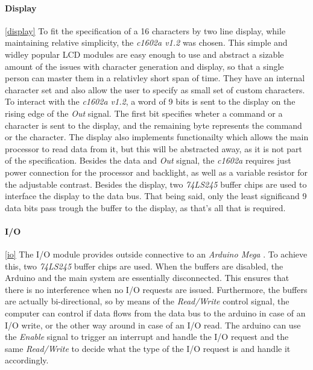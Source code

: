

\paragraph{Display} \ref{display}
To fit the specification of a 16 characters by two line display, while maintaining relative simplicity, the \emph{c1602a v1.2}
\cite{c1602a} was chosen. This simple and widley popular LCD modules are easy enough to use and abstract a sizable amount of the
issues with character generation and display, so that a single person can master them in a relativley short span of time. They have
an internal character set and also allow the user to specify as small set of custom characters. To interact with the
\emph{c1602a v1.2}, a word of 9 bits is sent to the display on the rising edge of the \emph{Out} signal. The first bit
specifies wheter a command or a character is sent to the display, and the remaining byte represents the command or the character.
The display also implements functionailty which allows the main processor to read data from it, but this will be abstracted away,
as it is not part of the specification. Besides the data and \emph{Out} signal, the \emph{c1602a} requires just power connection
for the processor and backlight, as well as a variable resistor for the adjustable contrast.
Besides the display, two \emph{74LS245} buffer chips \cite{74ls245} are used to interface the display to the data bus. That being
said, only the least significand 9 data bits pass trough the buffer to the display, as that's all that is required.



\paragraph{I/O} \ref{io}
The I/O module provides outside connective to an \emph{Arduino Mega} \cite{arduino2020mega}. To achieve this, two \emph{74LS245}
\cite{74ls245} buffer chips are used. When the buffers are disabled, the  Arduino and the main system are essentially
disconnected. This ensures that there is no interference when no I/O requests are issued. Furthermore, the buffers are
actually bi-directional, so by means of the \emph{Read/Write} control signal, the computer can control if data flows from
the data bus to the arduino in case of an I/O write, or the other way around in case of an I/O read. The arduino can use the
\emph{Enable} signal to trigger an interrupt and handle the I/O request and the same \emph{Read/Write} to decide what the type
of the I/O request is and handle it accordingly.

